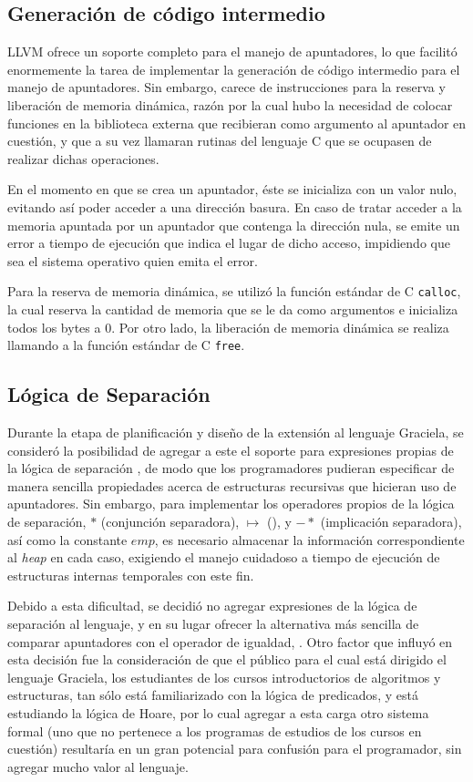 {{\subsection{Generación de código intermedio}

LLVM ofrece un soporte completo para el manejo de apuntadores, lo que facilitó
enormemente la tarea de implementar la generación de código intermedio para el
manejo de apuntadores. Sin embargo, carece de instrucciones para la reserva y
liberación de memoria dinámica, razón por la cual hubo la necesidad de colocar
funciones en la biblioteca externa que recibieran como argumento al apuntador en
cuestión, y que a su vez llamaran rutinas del lenguaje C que se ocupasen de
realizar dichas operaciones.

En el momento en que se crea un apuntador, éste se inicializa con un valor nulo,
evitando así poder acceder a una dirección basura. En caso de tratar acceder a
la memoria apuntada por un apuntador que contenga la dirección nula, se emite un
error a tiempo de ejecución que indica el lugar de dicho acceso, impidiendo que
sea el sistema operativo quien emita el error.

Para la reserva de memoria dinámica, se utilizó la función estándar de C
\texttt{calloc}, la cual reserva la cantidad de memoria que se le da como
argumentos e inicializa todos los bytes a 0. Por otro lado, la liberación de
memoria dinámica se realiza llamando a la función estándar de C \texttt{free}.

\subsection{Lógica de Separación}

Durante la etapa de planificación y diseño de la extensión al lenguaje Graciela,
se consideró la posibilidad de agregar a este el soporte para expresiones
propias de la lógica de separación , de modo
que los programadores pudieran especificar de manera sencilla propiedades acerca
de estructuras recursivas que hicieran uso de apuntadores. Sin embargo, para
implementar los operadores propios de la lógica de separación, $*$ (conjunción
separadora), $\mapsto$ (), y $-*$ (implicación
separadora), así como la constante $emp$, es necesario almacenar la información
correspondiente al \textit{heap} en cada caso, exigiendo el manejo cuidadoso a
tiempo de ejecución de estructuras internas temporales con este fin.

Debido a esta dificultad, se decidió no agregar expresiones de la lógica de
separación al lenguaje, y en su lugar ofrecer la alternativa más sencilla de
comparar apuntadores con el operador de igualdad, \ingra{==}. Otro factor que
influyó en esta decisión fue la consideración de que el público para el cual
está dirigido el lenguaje Graciela, los estudiantes de los cursos introductorios
de algoritmos y estructuras, tan sólo está familiarizado con la lógica de
predicados, y está estudiando la lógica de Hoare, por lo cual agregar a esta
carga otro sistema formal  (uno que no pertenece a los programas de
estudios de los cursos en cuestión) resultaría en un gran potencial para
confusión para el programador, sin agregar mucho valor al lenguaje.


}}
